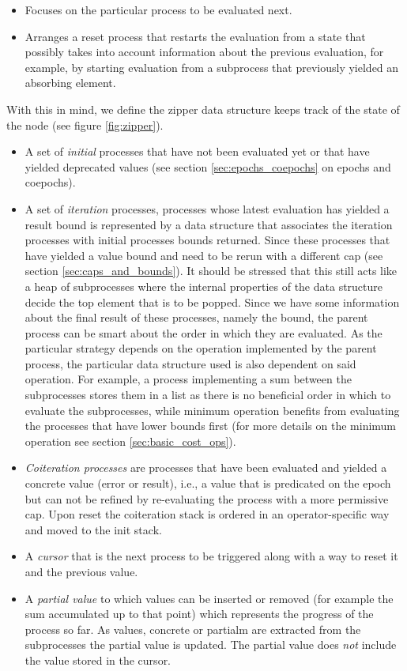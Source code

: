 \begin{itemize}
\item Focuses on the particular process to be evaluated next.
\item Arranges a reset process that restarts the evaluation from a
  state that possibly takes into account information about the
  previous evaluation, for example, by starting evaluation from a
  subprocess that previously yielded an absorbing element.
\end{itemize}

With this in mind, we define the zipper data structure keeps track of
the state of the node (see figure \ref{fig:zipper}).

\begin{itemize}
\item A set of \emph{initial} processes that have not been evaluated
  yet or that have yielded deprecated values (see section
  \ref{sec:epochs_coepochs} on epochs and coepochs).
\item A set of \emph{iteration} processes, processes whose latest
  evaluation has yielded a result bound is represented by a data
  structure that associates the iteration processes with initial
  processes bounds returned. Since these processes that have yielded a
  value bound and need to be rerun with a different cap (see section
  \ref{sec:caps_and_bounds}). It should be stressed that this still
  acts like a heap of subprocesses where the internal properties of
  the data structure decide the top element that is to be
  popped. Since we have some information about the final result of
  these processes, namely the bound, the parent process can be smart
  about the order in which they are evaluated. As the particular
  strategy depends on the operation implemented by the parent process,
  the particular data structure used is also dependent on said
  operation. For example, a process implementing a sum between the
  subprocesses stores them in a list as there is no beneficial order
  in which to evaluate the subprocesses, while minimum operation
  benefits from evaluating the processes that have lower bounds first
  (for more details on the minimum operation see section
  \ref{sec:basic_cost_ops}).

\item \emph{Coiteration processes} are processes that have been
  evaluated and yielded a concrete value (error or result), i.e., a
  value that is predicated on the epoch but can not be refined by
  re-evaluating the process with a more permissive cap. Upon reset the
  coiteration stack is ordered in an operator-specific way and moved
  to the init stack.
\item A \emph{cursor} that is the next process to be triggered along
  with a way to reset it and the previous value.
\item A \emph{partial value} to which values can be inserted or
  removed (for example the sum accumulated up to that point) which
  represents the progress of the process so far. As values, concrete
  or partialm are extracted from the subprocesses the partial value is
  updated. The partial value does \emph{not} include the value stored
  in the cursor.
\end{itemize}

